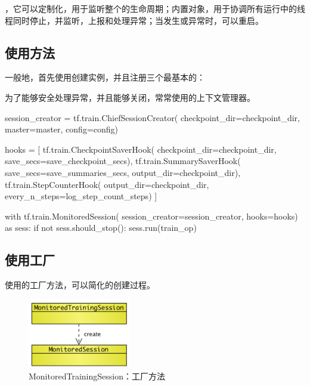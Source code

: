 \begin{content}

，它可以定制化，用于监听整个的生命周期；内置对象，用于协调所有运行中的线程同时停止，并监听，上报和处理异常；当发生或异常时，可以重启。

\subsection{使用方法}

一般地，首先使用创建实例，并且注册三个最基本的：

\begin{enum}
\end{enum}

为了能够安全处理异常，并且能够关闭，常常使用的上下文管理器。

\begin{leftbar}
\begin{python}
session_creator = tf.train.ChiefSessionCreator(
  checkpoint_dir=checkpoint_dir,
  master=master,
  config=config)

hooks = [
  tf.train.CheckpointSaverHook(
    checkpoint_dir=checkpoint_dir,
    save_secs=save_checkpoint_secs),
  tf.train.SummarySaverHook(
    save_secs=save_summaries_secs,
    output_dir=checkpoint_dir),
  tf.train.StepCounterHook(
    output_dir=checkpoint_dir, 
    every_n_steps=log_step_count_steps)
]

with tf.train.MonitoredSession(
  session_creator=session_creator,
  hooks=hooks) as sess:
  if not sess.should_stop():
    sess.run(train_op)
\end{python}
\end{leftbar}

\subsection{使用工厂}

使用的工厂方法，可以简化的创建过程。

\begin{figure}[!htbp]
\centering
\includegraphics[width=0.4\textwidth]{figures/py-train-monitored-training-session.png}
\caption{MonitoredTrainingSession：工厂方法}
 \label{fig:py-train-monitored-training-session}
\end{figure}


\end{content}
